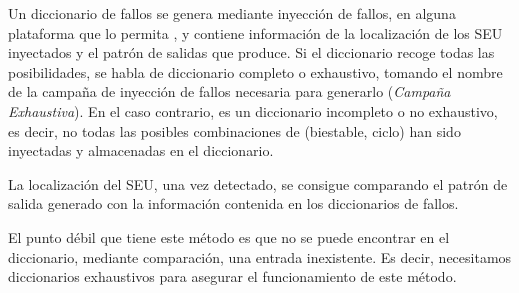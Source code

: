 Un diccionario de fallos se genera mediante inyección de fallos, en alguna
plataforma que lo permita \cite{FastFI, LeonFI, FTU}, y contiene información de 
la localización de los \gls{SEU} inyectados y el patrón de salidas que produce. 
Si el diccionario recoge todas las posibilidades, se habla de diccionario 
completo o exhaustivo, tomando el nombre de la campaña de inyección de fallos 
necesaria para generarlo (\textit{Campaña Exhaustiva}). En el caso contrario, es 
un diccionario incompleto o no exhaustivo, es decir, no todas las posibles 
combinaciones de (biestable, ciclo) han sido inyectadas y almacenadas en el 
diccionario. 

La localización del \gls{SEU}, una vez detectado, se consigue comparando el patrón
de salida generado con la información contenida en los diccionarios de fallos.

El punto débil que tiene este método es que no se puede encontrar en el
diccionario, mediante comparación, una entrada inexistente. Es decir, necesitamos
diccionarios exhaustivos para asegurar el funcionamiento de este método.


\cite{SEUDiagnosis}




\endinput
